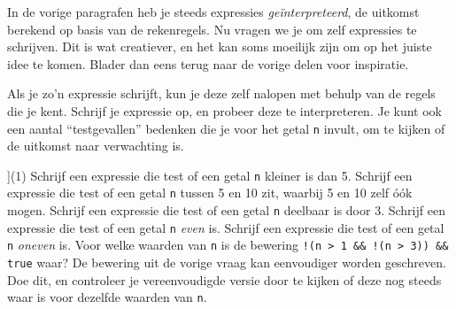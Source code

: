 In de vorige paragrafen heb je steeds expressies \emph{geïnterpreteerd}, de uitkomst berekend op basis van de rekenregels. Nu vragen we je om zelf expressies te schrijven. Dit is wat creatiever, en het kan soms moeilijk zijn om op het juiste idee te komen. Blader dan eens terug naar de vorige delen voor inspiratie.

Als je zo'n expressie schrijft, kun je deze zelf nalopen met behulp van de regels die je kent. Schrijf je expressie op, en probeer deze te interpreteren. Je kunt ook een aantal ``testgevallen'' bedenken die je voor het getal \texttt{n} invult, om te kijken of de uitkomst naar verwachting is.

\begin{exercise}
    \begin{longtasks}[counter-format=7.tsk[1]](1)
        \task
        Schrijf een expressie die test of een getal \texttt{n} kleiner is dan 5.
        \task
        Schrijf een expressie die test of een getal \texttt{n} tussen 5 en 10 zit, waarbij 5 en 10 zelf \'{o}\'{o}k mogen.
        \task
        Schrijf een expressie die test of een getal \texttt{n} deelbaar is door 3.
        \task
        Schrijf een expressie die test of een getal \texttt{n} \emph{even} is.
        \task
        Schrijf een expressie die test of een getal \texttt{n} \emph{oneven} is.
        \task
        Voor welke waarden van \texttt{n} is de bewering \texttt{!(n > 1 \&\& !(n > 3)) \&\& true} waar?
        \task
        De bewering uit de vorige vraag kan eenvoudiger worden geschreven. Doe dit, en controleer je vereenvoudigde versie door te kijken of deze nog steeds waar is voor dezelfde waarden van \texttt{n}.
    \end{longtasks}
\end{exercise}




